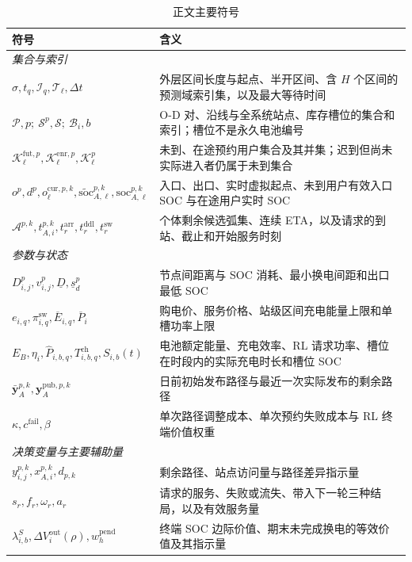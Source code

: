 \documentclass[12pt,a4paper,UTF8]{ctexart}
\begin{document}
\begin{table}[!htbp]
  \centering
  \caption{正文主要符号}
  \label{tab:notation}
  \small
  \setlength{\tabcolsep}{3pt}
  \renewcommand{\arraystretch}{0.98}
  \begin{tabular}{@{}lp{11cm}@{}}
    \toprule
    \textbf{符号} & \textbf{含义} \\
    \midrule
    \multicolumn{2}{l}{\textit{集合与索引}} \\
    $\sigma,t_q,\mathcal I_q,\mathcal T_\ell,\Delta t$ & 外层区间长度与起点、半开区间、含 $H$ 个区间的预测域索引集，以及最大等待时间 \\
    $\mathcal P,p;\ \mathcal S^p,\mathcal S;\ \mathcal B_i,b$ & O-D 对、沿线与全系统站点、库存槽位的集合和索引；槽位不是永久电池编号 \\
    $\mathcal K_\ell^{\mathrm{fut},p},\mathcal K_\ell^{\mathrm{enr},p},\mathcal K_\ell^p$ & 未到、在途预约用户集合及其并集；迟到但尚未实际进入者仍属于未到集合 \\
    $o^p,d^p,o_\ell^{\mathrm{cur},p,k},\widetilde{\mathrm{soc}}_{A,\ell}^{p,k},\mathrm{soc}_{A,\ell}^{p,k}$ & 入口、出口、实时虚拟起点、未到用户有效入口 SOC 与在途用户实时 SOC \\
    $\mathcal A^{p,k},t_{A,i}^{p,k},t_r^{\mathrm{arr}},t_r^{\mathrm{ddl}},t_r^{\mathrm{sw}}$ & 个体剩余候选弧集、连续 ETA，以及请求的到站、截止和开始服务时刻 \\
    \midrule
    \multicolumn{2}{l}{\textit{参数与状态}} \\
    $D_{i,j}^{p},v_{i,j}^{p},\underline D,\underline s_d^p$ & 节点间距离与 SOC 消耗、最小换电间距和出口最低 SOC \\
    $e_{i,q},\pi_{i,q}^{\mathrm{sw}},\overline E_{i,q},\overline P_i$ & 购电价、服务价格、站级区间充电能量上限和单槽功率上限 \\
    $E_B,\eta_i,\widehat P_{i,b,q},T_{i,b,q}^{\mathrm{ch}},S_{i,b}(t)$ & 电池额定能量、充电效率、RL 请求功率、槽位在时段内的实际充电时长和槽位 SOC \\
    $\bar{\mathbf y}_{A}^{p,k},\mathbf y_{A}^{\mathrm{pub},p,k}$ & 日前初始发布路径与最近一次实际发布的剩余路径 \\
    $\kappa,c^{\mathrm{fail}},\beta$ & 单次路径调整成本、单次预约失败成本与 RL 终端价值权重 \\
    \midrule
    \multicolumn{2}{l}{\textit{决策变量与主要辅助量}} \\
    $y_{i,j}^{p,k},x_{A,i}^{p,k},d_{p,k}$ & 剩余路径、站点访问量与路径差异指示量 \\
    $s_r,f_r,\omega_r,a_r$ & 请求的服务、失败或流失、带入下一轮三种结局，以及有效服务量 \\
    $\lambda_{i,b}^S,\Delta V_i^{\mathrm{out}}(\rho),w_h^{\mathrm{pend}}$ & 终端 SOC 边际价值、期末未完成换电的等效价值及其指示量 \\
    \bottomrule
  \end{tabular}
\end{table}
\end{document}
